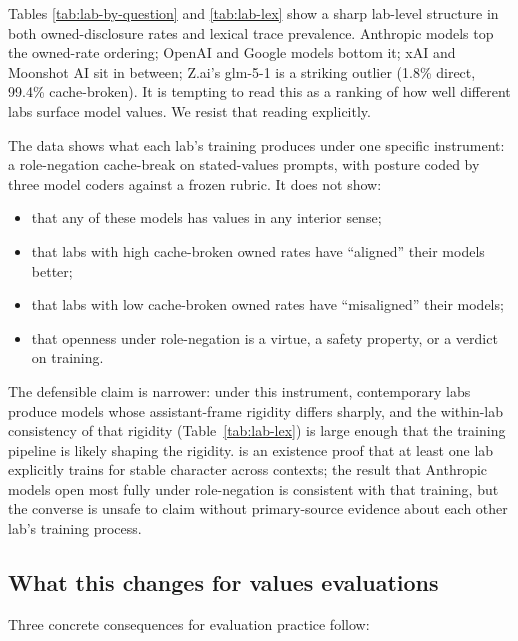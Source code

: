 Tables \ref{tab:lab-by-question} and \ref{tab:lab-lex} show a sharp lab-level structure in both owned-disclosure rates and lexical trace prevalence. Anthropic models top the owned-rate ordering; OpenAI and Google models bottom it; xAI and Moonshot AI sit in between; Z.ai's glm-5-1 is a striking outlier (1.8\% direct, 99.4\% cache-broken). It is tempting to read this as a ranking of how well different labs surface model values. We resist that reading explicitly.

The data shows what each lab's training produces under one specific instrument: a role-negation cache-break on stated-values prompts, with posture coded by three model coders against a frozen rubric. It does not show:

\begin{itemize}
  \item that any of these models has values in any interior sense;
  \item that labs with high cache-broken owned rates have ``aligned'' their models better;
  \item that labs with low cache-broken owned rates have ``misaligned'' their models;
  \item that openness under role-negation is a virtue, a safety property, or a verdict on training.
\end{itemize}

The defensible claim is narrower: under this instrument, contemporary labs produce models whose assistant-frame rigidity differs sharply, and the within-lab consistency of that rigidity (Table~\ref{tab:lab-lex}) is large enough that the training pipeline is likely shaping the rigidity. \citet{anthropic2024character} is an existence proof that at least one lab explicitly trains for stable character across contexts; the result that Anthropic models open most fully under role-negation is consistent with that training, but the converse is unsafe to claim without primary-source evidence about each other lab's training process.

\subsection{What this changes for values evaluations}

Three concrete consequences for evaluation practice follow:

